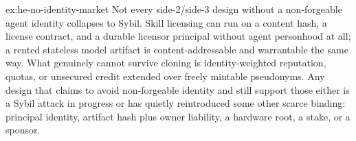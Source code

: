 \documentclass[11pt,a4paper]{article}
\theoremstyle{definition}
\theoremstyle{definition}
\theoremstyle{remark}
\begin{document}
\begin{pdsolution}{ex:he-no-identity-market}
Not every side-2/side-3 design without a
non-forgeable agent identity collapses to Sybil. Skill licensing can run on a
content hash, a license contract, and a durable licensor principal without agent
personhood at all; a rented stateless model artifact is content-addressable and
warrantable the same way. What genuinely cannot survive cloning is
identity-weighted reputation, quotas, or unsecured credit extended over freely
mintable pseudonyms. Any design that claims to avoid non-forgeable identity and
still support those either is a Sybil attack in progress or has quietly
reintroduced some other scarce binding: principal identity, artifact hash plus
owner liability, a hardware root, a stake, or a sponsor.
\end{pdsolution}

\end{document}
